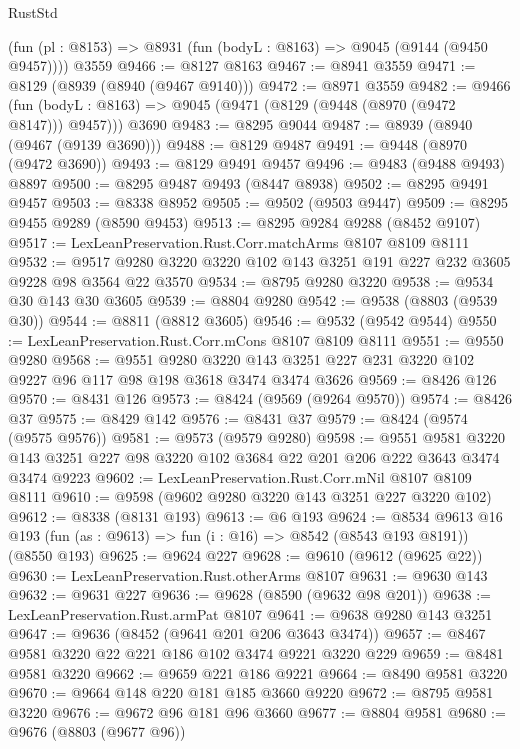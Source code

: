 \begin{lexlean}{RustStd}
\begin{coremodule}
    (fun (pl : @8153) => @8931 (fun (bodyL : @8163) => @9045 (@9144 (@9450 @9457))))
    @3559
@9466 := @8127 @8163
@9467 := @8941 @3559
@9471 := @8129 (@8939 (@8940 (@9467 @9140)))
@9472 := @8971 @3559
@9482 := @9466
    (fun (bodyL : @8163) => @9045 (@9471 (@8129 (@9448 (@8970 (@9472 @8147))) @9457)))
    @3690
@9483 := @8295 @9044
@9487 := @8939 (@8940 (@9467 (@9139 @3690)))
@9488 := @8129 @9487
@9491 := @9448 (@8970 (@9472 @3690))
@9493 := @8129 @9491 @9457
@9496 := @9483 (@9488 @9493) @8897
@9500 := @8295 @9487 @9493 (@8447 @8938)
@9502 := @8295 @9491 @9457
@9503 := @8338 @8952
@9505 := @9502 (@9503 @9447)
@9509 := @8295 @9455 @9289 (@8590 @9453)
@9513 := @8295 @9284 @9288 (@8452 @9107)
@9517 := LexLeanPreservation.Rust.Corr.matchArms @8107 @8109 @8111
@9532 := @9517 @9280 @3220 @3220 @102 @143 @3251 @191 @227 @232 @3605 @9228 @98 @3564 @22 @3570
@9534 := @8795 @9280 @3220
@9538 := @9534 @30 @143 @30 @3605
@9539 := @8804 @9280
@9542 := @9538 (@8803 (@9539 @30))
@9544 := @8811 (@8812 @3605)
@9546 := @9532 (@9542 @9544)
@9550 := LexLeanPreservation.Rust.Corr.mCons @8107 @8109 @8111
@9551 := @9550 @9280
@9568 := @9551
    @9280
    @3220
    @143
    @3251
    @227
    @231
    @3220
    @102
    @9227
    @96
    @117
    @98
    @198
    @3618
    @3474
    @3474
    @3626
@9569 := @8426 @126
@9570 := @8431 @126
@9573 := @8424 (@9569 (@9264 @9570))
@9574 := @8426 @37
@9575 := @8429 @142
@9576 := @8431 @37
@9579 := @8424 (@9574 (@9575 @9576))
@9581 := @9573 (@9579 @9280)
@9598 := @9551
    @9581
    @3220
    @143
    @3251
    @227
    @98
    @3220
    @102
    @3684
    @22
    @201
    @206
    @222
    @3643
    @3474
    @3474
    @9223
@9602 := LexLeanPreservation.Rust.Corr.mNil @8107 @8109 @8111
@9610 := @9598 (@9602 @9280 @3220 @143 @3251 @227 @3220 @102)
@9612 := @8338 (@8131 @193)
@9613 := @6 @193
@9624 := @8534
    @9613
    @16
    @193
    (fun (as : @9613) => fun (i : @16) => @8542 (@8543 @193 @8191))
    (@8550 @193)
@9625 := @9624 @227
@9628 := @9610 (@9612 (@9625 @22))
@9630 := LexLeanPreservation.Rust.otherArms @8107
@9631 := @9630 @143
@9632 := @9631 @227
@9636 := @9628 (@8590 (@9632 @98 @201))
@9638 := LexLeanPreservation.Rust.armPat @8107
@9641 := @9638 @9280 @143 @3251
@9647 := @9636 (@8452 (@9641 @201 @206 @3643 @3474))
@9657 := @8467 @9581 @3220 @22 @221 @186 @102 @3474 @9221 @3220 @229
@9659 := @8481 @9581 @3220
@9662 := @9659 @221 @186 @9221
@9664 := @8490 @9581 @3220
@9670 := @9664 @148 @220 @181 @185 @3660 @9220
@9672 := @8795 @9581 @3220
@9676 := @9672 @96 @181 @96 @3660
@9677 := @8804 @9581
@9680 := @9676 (@8803 (@9677 @96))

\end{coremodule}
\end{lexlean}
